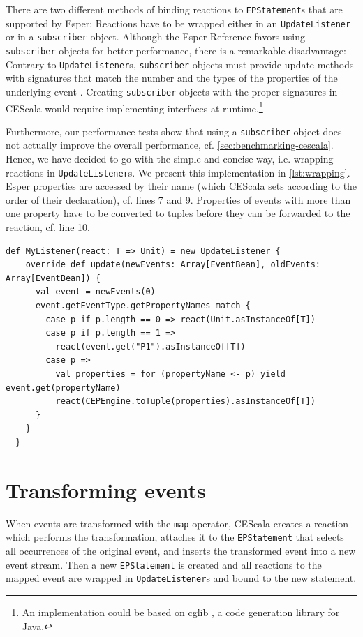 \documentclass[book,type=bsc,colorback,accentcolor=tud8b,12pt,twoside]{tudthesis}
\begin{document}
There are two different methods of binding reactions to \mbox{\texttt{EPStatement}}s that are supported by Esper: Reactions have to be wrapped either in an \mbox{\texttt{UpdateListener}} or in a \mbox{\texttt{subscriber}} object.  Although the Esper Reference favors using \mbox{\texttt{subscriber}} objects for better performance, there is a remarkable disadvantage: Contrary to \mbox{\texttt{UpdateListener}}s, \mbox{\texttt{subscriber}} objects must provide update methods with signatures that match the number and the types of the properties of the underlying event \cite{Esper}.  Creating \mbox{\texttt{subscriber}} objects with the proper signatures in CEScala would require implementing interfaces at runtime.\footnote{An implementation could be based on cglib \cite{cglib}, a code generation library for Java.}  

Furthermore, our performance tests show that using a \mbox{\texttt{subscriber}} object does not actually improve the overall performance, cf. \autoref{sec:benchmarking-cescala}.  Hence, we have decided to go with the simple and concise way, i.e. wrapping reactions in \mbox{\texttt{UpdateListener}}s.  We present this implementation in  \autoref{lst:wrapping}.  Esper properties are accessed by their name (which CEScala sets according to the order of their declaration), cf. lines 7 and 9.  Properties of events with more than one property have to be converted to tuples before they can be forwarded to the reaction, cf. line 10.

\begin{lstlisting}[caption=Wrapping reactions in \mbox{\texttt{UpdateListener}}s,label=lst:wrapping,float=tp]
  def MyListener(react: T => Unit) = new UpdateListener {
    override def update(newEvents: Array[EventBean], oldEvents: Array[EventBean]) {
      val event = newEvents(0)
      event.getEventType.getPropertyNames match {
        case p if p.length == 0 => react(Unit.asInstanceOf[T])
        case p if p.length == 1 =>
          react(event.get("P1").asInstanceOf[T])
        case p =>
          val properties = for (propertyName <- p) yield event.get(propertyName)
          react(CEPEngine.toTuple(properties).asInstanceOf[T])
      }
    }
  }
\end{lstlisting}

\section{Transforming events}
\label{sec:transforming-events}

When events are transformed with the \mbox{\texttt{map}} operator, CEScala creates a reaction which performs the transformation, attaches it to the \mbox{\texttt{EPStatement}} that selects all occurrences of the original event, and inserts the transformed event into a new event stream.  Then a new \mbox{\texttt{EPStatement}} is created and all reactions to the mapped event are wrapped in \mbox{\texttt{UpdateListener}}s and bound to the new statement.  
\end{document}
